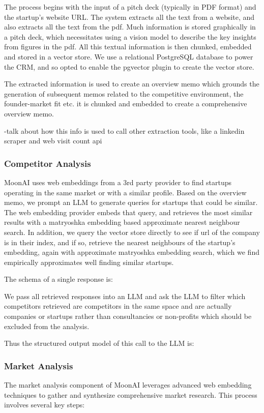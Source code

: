\documentclass[a4paper, oneside]{discothesis}
\begin{document}
The process begins with the input of a pitch deck (typically in PDF format) and the startup's website URL. The system extracts all the text from a website, and also extracts all the text from the pdf. Much information is stored graphically in a pitch deck, which necessitates using a vision model to describe the key insights from figures in the pdf. All this textual information is then chunked, embedded and stored in a vector store. We use a relational PostgreSQL database to power the CRM, and so opted to enable the pgvector plugin to create the vector store.

The extracted information is used to create an overview memo which grounds the generation of subsequent memos related to the competitive environment, the founder-market fit etc. it is chunked and embedded to create a comprehensive overview memo. 

-talk about how this info is used to call other extraction tools, like a linkedin scraper and web visit count api


\subsubsection{Competitor Analysis}
MoonAI uses web embeddings from a 3rd party provider to find startups operating in the same market or with a similar profile. Based on the overview memo, we prompt an LLM to generate queries for startups that could be similar. The web embedding provider embeds that query, and retrieves the most similar results with a matryoshka embedding based approximate nearest neighbour search. In addition, we query the vector store directly to see if url of the company is in their index, and if so, retrieve the nearest neighbours of the startup's embedding, again with approximate matryoshka embedding search, which we find empirically approximates well finding similar startups. 

The schema of a single response is:

We pass all retrieved responses into an LLM and ask the LLM to filter which competitors retrieved are competitors in the same space and are actually companies or startups rather than consultancies or non-profits which should be excluded from the analysis. 

Thus the structured output model of this call to the LLM is:

\subsubsection{Market Analysis}
The market analysis component of MoonAI leverages advanced web embedding techniques to gather and synthesize comprehensive market research. This process involves several key steps:
\end{document}
